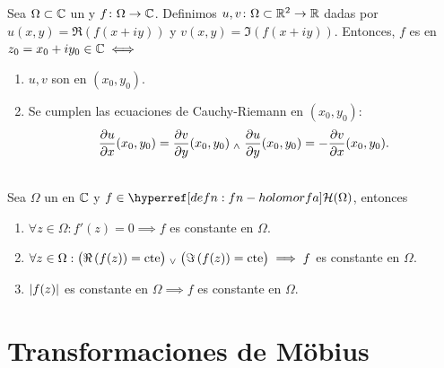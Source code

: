 \begin{teo}\label{teo:cauchy-riemann}
    Sea $\Omega \subset \mathbb{C}$ un  y $f \colon \Omega \to \mathbb{C}$. Definimos $u, v \colon \Omega \subset \mathbb{R}^2 \to \mathbb{R}$ dadas por $u(x, y) = \Re \left(f(x + iy)\right)$ y $v(x, y) = \Im \left(f(x + iy)\right)$. Entonces, $f$ es  en $z_0 = x_0 + iy_0 \in \mathbb{C} \iff$
    \begin{enumerate}
        \item $u, v$ son  en $(x_0, y_0)$.
        \item Se cumplen las ecuaciones de Cauchy-Riemann en $(x_0, y_0)$:
        \begin{equation}\label{eq-cauchy-riemann}
            \pdv{u}{x}(x_0, y_0) = \pdv{v}{y}(x_0, y_0) \; _{\wedge} \; \pdv{u}{y}(x_0, y_0) = -\pdv{v}{x}(x_0, y_0).
        \end{equation}
    \end{enumerate}
\end{teo}

\begin{prop}\label{prop:consecuencias-cauchy-riemann}\mbox{}\\
    Sea $\Omega$ un  en $\mathbb{C}$ y $f \in \exhyperref[defn:fn-holomorfa]{fn-holomorfa}{\mathcal{H}}(\Omega)$, entonces
    \begin{enumerate}[label=\textnormal{(\arabic*)}]
        \item $\forall z \in \Omega : f'(z) = 0 \implies f$ es constante en $\Omega$.
        \item $\forall z \in \Omega : \big(\Re \left(f(z)\right) = \textnormal{cte}\big) \; _{\vee} \; \big(\Im \left(f(z)\right)= \textnormal{cte}\big) \implies f$ es constante en $\Omega$. 
        \item $\left|f(z)\right|$ es constante en $\Omega \implies f$ es constante en $\Omega$.
    \end{enumerate}
\end{prop}

\section{Transformaciones de Möbius}


